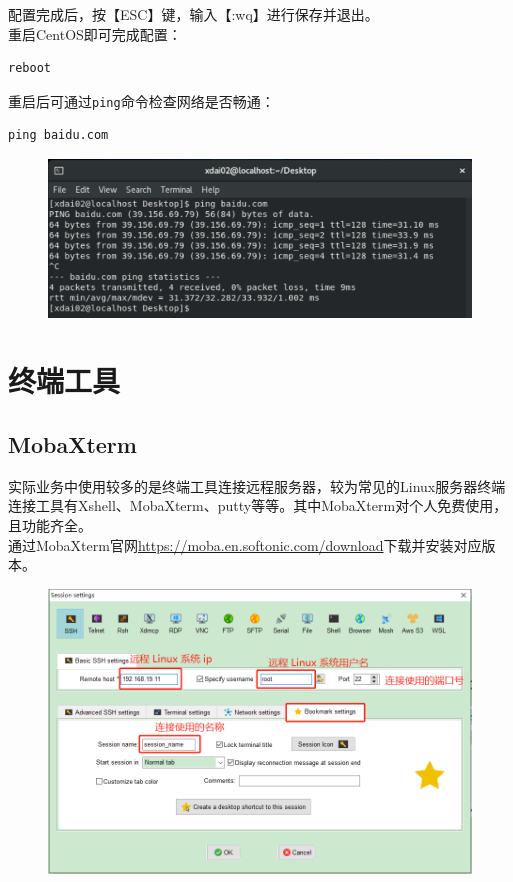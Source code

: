 \documentclass[12pt, openany, oneside]{book}
\begin{document}
配置完成后，按【ESC】键，输入【:wq】进行保存并退出。 \\

重启CentOS即可完成配置：

\begin{lstlisting}
reboot
\end{lstlisting}

重启后可通过\lstinline|ping|命令检查网络是否畅通：

\vspace{-0.5cm}
\begin{lstlisting}
ping baidu.com
\end{lstlisting}

\begin{figure}[H]
	\centering
	\includegraphics[scale=0.6]{img/C1/1-4/11.png}
\end{figure}

\newpage

\section{终端工具}

\subsection{MobaXterm}

实际业务中使用较多的是终端工具连接远程服务器，较为常见的Linux服务器终端连接工具有Xshell、MobaXterm、putty等等。其中MobaXterm对个人免费使用，且功能齐全。 \\

通过MobaXterm官网\url{https://moba.en.softonic.com/download}下载并安装对应版本。 \\

\begin{figure}[H]
	\centering
	\includegraphics[scale=0.4]{img/C1/1-5/1.png}
\end{figure}
\end{document}
